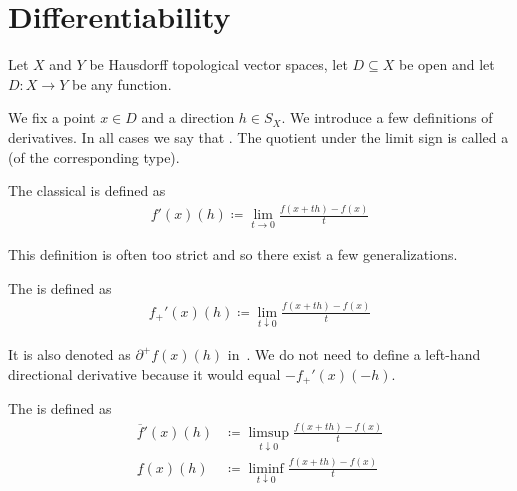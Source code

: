 \section{Differentiability}\label{sec:differentiability}

Let $X$ and $Y$ be Hausdorff topological vector spaces, let $D \subseteq X$ be open and let $D: X \to Y$ be any function.

\begin{definition}\label{def:derivatives}
  We fix a point $x \in D$ and a direction $h \in S_X$. We introduce a few definitions of derivatives. In all cases we say that . The quotient under the limit sign is called a  (of the corresponding type).

  \begin{defenum}
    \item\label{def:derivatives/classical} The classical  is defined as
    \begin{align*}
      f'(x)(h) \coloneqq \lim_{t \to 0} \frac {f(x + th) - f(x)} t
    \end{align*}

    This definition is often too strict and so there exist a few generalizations.

    \item\label{def:derivatives/onesided}\cite[lemma 1.2]{Phelps1993} The  is defined as
    \begin{align*}
      f_+'(x)(h) \coloneqq \lim_{t \downarrow 0} \frac {f(x + th) - f(x)} t
    \end{align*}

    It is also denoted as $\partial^+ f(x)(h)$ in~\cite[lemma 1.2]{Phelps1993}. We do not need to define a left-hand directional derivative because it would equal $-f_+'(x)(-h)$.

    \item\label{def:derivatives/dini}\cite[definition 11.18]{Clarke2013} The  is defined as
    \begin{align*}
      \overline f'(x)(h) &\coloneqq \limsup_{t \downarrow 0} \frac {f(x + th) - f(x)} t
      \\
      \underline f(x)(h) &\coloneqq \liminf_{t \downarrow 0} \frac {f(x + th) - f(x)} t
    \end{align*}


\end{defenum}
\end{definition}
